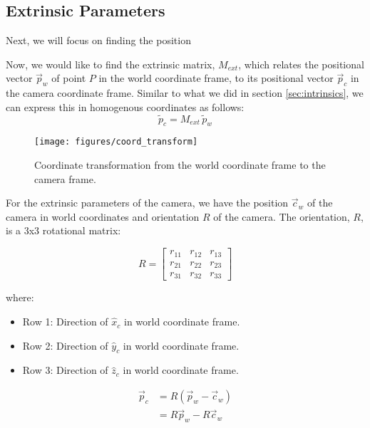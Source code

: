 \subsection{Extrinsic Parameters} \label{sec:extrinsics}

Next, we will focus on finding the position 

Now, we would like to find the extrinsic matrix, $M_{ext}$, which relates the positional vector $\vec{p}_w$ of point $P$ in the world coordinate frame, to its positional vector $\vec{p}_c$ in the camera coordinate frame. Similar to what we did in section \ref{sec:intrinsics}, we can express this in homogenous coordinates as follows:
\begin{equation} \label{eq:pc}
    \widetilde{p}_c =  M_{ext}\,\widetilde{p}_w
\end{equation}

\begin{figure}[H]
    \centering
    \texttt{[image: figures/coord\_transform]}
    \caption{Coordinate transformation from the world coordinate frame to the camera frame.}
\end{figure}


For the extrinsic parameters of the camera, we have the position $\vec{c}_w$ of the camera in world coordinates and orientation $R$ of the camera. The orientation, $R$, is a 3x3 rotational matrix: 

\begin{equation}
    R = 
    \begin{bmatrix}
        r_{11} & r_{12} & r_{13} \\
        r_{21} & r_{22} & r_{23} \\
        r_{31} & r_{32} & r_{33}
    \end{bmatrix}
\end{equation}

\noindent where:
\begin{itemize}
    \item Row 1: Direction of $\hat{x}_c$ in world coordinate frame.
    \item Row 2: Direction of $\hat{y}_c$ in world coordinate frame.
    \item Row 3: Direction of $\hat{z}_c$ in world coordinate frame.
\end{itemize}

\noindent 

\begin{subequations}
    \begin{align}
        \vec{p}_c & = R(\vec{p}_w-\vec{c}_w) \\
                  & = R\vec{p}_w -R\vec{c}_w  
    \end{align}
\end{subequations}



